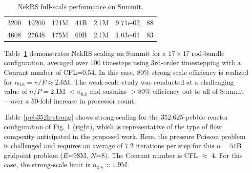 \begin{table}[b]
\begin{tabular}{|c|c|c|c|c|c|r|}
 3200 & 19200 & 121M      & 41B   &  2.1M  & 9.71e-02  & 88    \\%
 4608 & 27648 & 175M      & 60B   &  2.1M  & 1.03e-01  & 83    \\%
 \hline
 \end{tabular}
 \caption{\small\label{rod-strong-weak} NekRS full-scale performance on Summit.}
\end{table}

Table~\ref{rod-strong-weak} demonstrates NekRS scaling on Summit for a
$17 \times 17$ rod-bundle configuration, averaged over 100 timesteps
using 3rd-order timestepping with a Courant number of CFL=0.54.
In this case, 80\% strong-scale efficiency is realized for 
$n_{0.8} = n/P \approx 2.6$M.  The weak-scale study was conducted at a 
challenging value of $n/P = $2.1M $< n_{0.8}$ and sustains $> 80\%$
efficiency out to all of Summit---over a 50-fold increase in processor count.

Table~\ref{peb352k-strong} shows strong-scaling for the 352,625-pebble reactor
configuration of Fig. 1 (right), which is representative of the type of flow
compexity anticipated in the proposed work.  Here, the pressure Poisson 
problem is challenged and requires an average of 7.2 iterations per step
for this $n=51$B gridpoint problem ($E$=98M, $N$=8).  The Courant number
is CFL $\approx$ 4.  For this case, the strong-scale limit is $n_{0.8}\approx 1.9$M.

